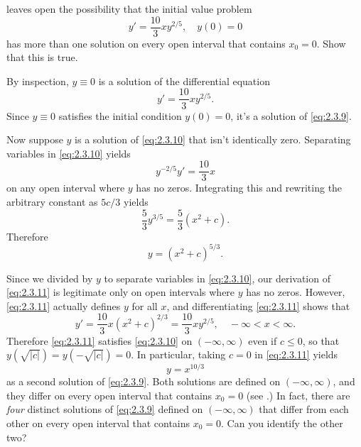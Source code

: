 \begin{example}\label{example:2.3.6}
 leaves open the possibility  that the
initial value problem
\begin{equation} \label{eq:2.3.9}
y'=\frac{10 }{3}xy^{2/5}, \quad y(0)=0
\end{equation}
has more than one solution on every open interval that contains $x_0=0$.  Show
that this is true.
\end{example}

\begin{solution}
By inspection, $y\equiv0$ is a solution of the
differential equation
\begin{equation} \label{eq:2.3.10}
y'=\frac{10 }{3} xy ^{2/5}.
\end{equation}
 Since $y\equiv0$ satisfies the initial condition $y(0)=0$,
it's a solution of \eqref{eq:2.3.9}.

Now suppose  $y$ is a solution of \eqref{eq:2.3.10} that isn't
identically zero.
 Separating variables in \eqref{eq:2.3.10} yields
\[
 y^{-2/5}y'=\frac{10 }{3}x
\]
on any open interval where $y$ has no zeros.
 Integrating this and rewriting the arbitrary constant as $5c/3$ yields
\[
\frac{5}{3}y^{3/5} = \frac{5}{3}(x^2+c).
\]
Therefore
\begin{equation} \label{eq:2.3.11}
y = (x^2+c)^{5/3}.
\end{equation}

Since we divided by $y$ to separate variables in \eqref{eq:2.3.10}, our
derivation of \eqref{eq:2.3.11} is legitimate only on open intervals where $y$
has no zeros. However, \eqref{eq:2.3.11} actually defines $y$ for all $x$,
and differentiating \eqref{eq:2.3.11} shows that
\[
y'=\frac{10 }{3}x(x^2+c)^{2/3}=\frac{10 }{3}xy^{2/5},\quad-\infty<x<\infty.
\]
Therefore \eqref{eq:2.3.11} satisfies \eqref{eq:2.3.10} on
$(-\infty,\infty)$
even if $c\le 0$, so that $y(\sqrt{|c|})=y(-\sqrt{|c|})=0$. In
particular, taking $c=0$ in \eqref{eq:2.3.11} yields
\[
y=x^{10/3}
\]
as a second solution of \eqref{eq:2.3.9}.
 Both solutions are defined on
$(-\infty,\infty)$, and they differ on every
open interval that contains $x_0=0$ (see .)
In fact, there are \emph{\color{blue}four} distinct solutions of
\eqref{eq:2.3.9}  defined on $(-\infty,\infty)$ that differ
from each other on every open interval that contains $x_0=0$.
  Can you identify the other two?
\end{solution}

